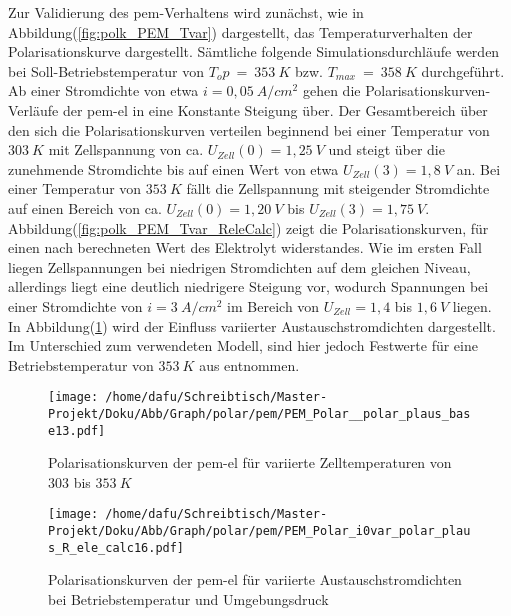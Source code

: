 \documentclass[onecolumn,10pt,titlepage]{article}
\begin{document}


Zur Validierung des \gls{pem}-Verhaltens wird zunächst, wie in Abbildung(\ref{fig:polk_PEM_Tvar}) dargestellt, das Temperaturverhalten der Polarisationskurve dargestellt.
%
Sämtliche folgende Simulationsdurchläufe werden bei Soll-Betriebstemperatur von $T_op~=~353~K$ bzw. $T_{max} ~=~ 358~K$ durchgeführt.\\
Ab einer Stromdichte von etwa $i=0,05~A/cm^2$ gehen die Polarisationskurven-Verläufe der \gls{pem}-\gls{el} in eine Konstante Steigung über. Der Gesamtbereich über den sich die Polarisationskurven verteilen beginnend bei einer Temperatur von $303~K$ mit Zellspannung von ca. $U_{Zell}(0)=1,25~V$ und steigt über die zunehmende Stromdichte bis auf einen Wert von etwa $U_{Zell}(3)=1,8~V$ an. Bei einer Temperatur von $353~K$ fällt die Zellspannung mit steigender Stromdichte auf einen Bereich von ca. $U_{Zell}(0)=1,20~V$ bis $U_{Zell}(3)=1,75~V$.\\
 Abbildung(\ref{fig:polk_PEM_Tvar_ReleCalc}) zeigt die Polarisationskurven, für einen nach \cite{Chandesris2015} berechneten Wert des Elektrolyt
widerstandes. Wie im ersten Fall liegen Zellspannungen bei niedrigen Stromdichten auf dem gleichen Niveau, allerdings liegt eine deutlich niedrigere Steigung vor, wodurch Spannungen bei einer Stromdichte von $i=3~A/cm^2$ im Bereich von $U_{Zell}=1,4$ bis $1,6~V$ liegen.\\
In Abbildung(\ref{fig:polk_PEM_i0var}) wird der Einfluss variierter Austauschstromdichten dargestellt. Im Unterschied zum verwendeten Modell, sind hier jedoch Festwerte für eine Betriebstemperatur von $353~K$ aus \cite{Espinosa-Lopez2018} entnommen.
\begin{figure}[!tbp]
	\centering
	\begin{minipage}[t]{0.49\textwidth}
		\texttt{[image: /home/dafu/Schreibtisch/Master-Projekt/Doku/Abb/Graph/polar/pem/PEM\_Polar\_\_polar\_plaus\_base13.pdf]}
		
		\caption[Polarisationskurven der \gls{pem}-\gls{el} für variierte Betriebstemperaturen]{Polarisationskurven der \gls{pem}-\gls{el} für variierte Zelltemperaturen von $303$ bis $353~K$}
		\label{fig:polk_PEM_Tvar} 
	\end{minipage}
	\hfill
	\begin{minipage}[t]{0.49\textwidth}
		\texttt{[image: /home/dafu/Schreibtisch/Master-Projekt/Doku/Abb/Graph/polar/pem/PEM\_Polar\_i0var\_polar\_plaus\_R\_ele\_calc16.pdf]}
		\caption[Polarisationskurven der \gls{pem}-\gls{el} für variierte Austauschstromdichten]{Polarisationskurven der \gls{pem}-\gls{el} für variierte Austauschstromdichten bei Betriebstemperatur und Umgebungsdruck}
		\label{fig:polk_PEM_i0var} 
	\end{minipage}
\end{figure}
\end{document}

